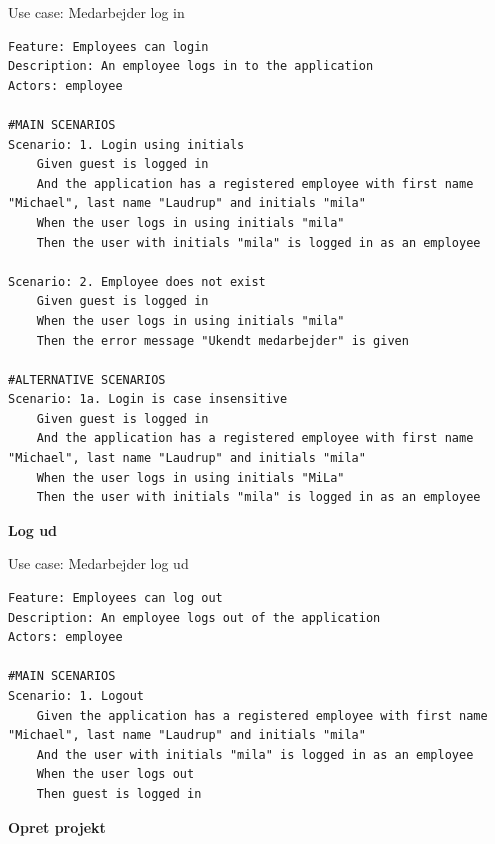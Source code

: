 \begin{listing}[H]
    \centering
    \caption{Use case: Medarbejder log in}\label{lst:usecase_login}
    \begin{verbatim}  
Feature: Employees can login
Description: An employee logs in to the application
Actors: employee

#MAIN SCENARIOS
Scenario: 1. Login using initials
    Given guest is logged in
    And the application has a registered employee with first name "Michael", last name "Laudrup" and initials "mila"
    When the user logs in using initials "mila" 
    Then the user with initials "mila" is logged in as an employee

Scenario: 2. Employee does not exist
    Given guest is logged in
    When the user logs in using initials "mila" 
    Then the error message "Ukendt medarbejder" is given

#ALTERNATIVE SCENARIOS
Scenario: 1a. Login is case insensitive
    Given guest is logged in
    And the application has a registered employee with first name "Michael", last name "Laudrup" and initials "mila"
    When the user logs in using initials "MiLa" 
    Then the user with initials "mila" is logged in as an employee
    \end{verbatim}
\end{listing}
\textbf{Log ud}
\begin{listing}[H]
    \centering
    \caption{Use case: Medarbejder log ud}\label{lst:usecase_logout}
    \begin{verbatim}  
Feature: Employees can log out
Description: An employee logs out of the application
Actors: employee

#MAIN SCENARIOS
Scenario: 1. Logout
    Given the application has a registered employee with first name "Michael", last name "Laudrup" and initials "mila"
    And the user with initials "mila" is logged in as an employee
    When the user logs out
    Then guest is logged in
    \end{verbatim}
\end{listing}
\textbf{Opret projekt}
